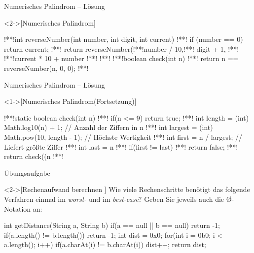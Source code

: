 \begin{frame}[fragile,c]{Numerisches Palindrom -- Lösung}
    \begin{solve}<2->[Numerisches Palindrom]
\begin{plainjava}
!**!int reverseNumber(int number, int digit, int current) {
!**!    if (number == 0) return current;
!**!    return reverseNumber(!**!number / 10,!**! digit + 1,
!**!                !**!current * 10 + number %
!**!}
!**!
!**!boolean check(int n) {
!**!    return n == reverseNumber(n, 0, 0);
!**!}
\end{plainjava}
    \end{solve}
\end{frame}

\begin{frame}[fragile,c]{Numerisches Palindrom -- Lösung}
    \addtocounter{solve}{-1}%
    \begin{solve}<1->[Numerisches Palindrom\hfill{}(Fortsetzung)]
\begin{plainjava}
!**!static boolean check(int n) {
!**!    if(n <= 9) return true;
!**!    int length = (int) Math.log10(n) + 1; // Anzahl der Ziffern in n
!**!    int largest = (int) Math.pow(10, length - 1); // Höchste Wertigkeit
!**!    int first = n / largest; // Liefert größte Ziffer
!**!    int last = n %
!**!    if(first != last)
!**!        return false;
!**!    return check((n %
!**!}
\end{plainjava}
    \end{solve}
\end{frame}

\begin{frame}[fragile,c]{Übungsaufgabe}
    \begin{exercise}<2->[Rechenaufwand berechnen ]
        \pause{}Wie viele Rechenschritte benötigt das folgende Verfahren einmal im \emph{worst-} und im \emph{best-case}? Geben Sie jeweils auch die \O-Notation an: \pause{}
\begin{plainjava}
int getDistance(String a, String b){
    if(a == null || b == null) return -1;
    if(a.length() != b.length()) return -1;
    int dist = 0x0;
    for(int i = 0b0; i < a.length(); i++)
        if(a.charAt(i) != b.charAt(i))
            dist++;
    return dist;
}
\end{plainjava}
    \end{exercise}
\end{frame}

